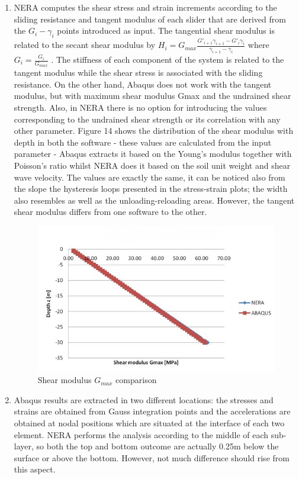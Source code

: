 \begin{enumerate}
		\item NERA computes the shear stress and strain increments according to the sliding resistance and tangent modulus of each slider that are derived from the $G_i-\gamma_i$ points introduced as input. The tangential shear modulus is related to the secant shear modulus by $H_i=G_{max}\frac{G'_{i+1}\gamma_{i+1}-G'_i\gamma_i}{\gamma_{i+1}-\gamma_i}$ where $G_i=\frac{G_i}{G_{max}}$ . The stiffness of each component of the system is related to the tangent modulus while the shear stress is associated with the sliding resistance. On the other hand, Abaqus does not work with the tangent modulus, but with maximum shear modulus Gmax and the undrained shear strength. Also, in NERA there is no option for introducing the values corresponding to the undrained shear strength or its correlation with any other parameter. Figure 14 shows the distribution of the shear modulus with depth in both the software - these values are calculated from the input parameter - Abaqus extracts it based on the Young's modulus together with Poisson's ratio whilst NERA does it based on the soil unit weight and shear wave velocity. The values are exactly the same, it can be noticed also from the slope the hysteresis loops presented in the stress-strain plots; the width also resembles as well as the unloading-reloading areas. However, the tangent shear modulus differs from one software to the other.
		\begin{figure}[h!]
			\centering
			\includegraphics[width=0.5\linewidth]{"shear"}
			\caption{Shear modulus $G_{max}$ comparison}
			\label{shear1}
		\end{figure}
		\item Abaqus results are extracted in two different locations: the stresses and strains are obtained from Gauss integration points and the accelerations are obtained at nodal positions which are situated at the interface of each two element. NERA performs the analysis according to the middle of each sub-layer, so both the top and bottom outcome are actually 0.25m below the surface or above the bottom. However, not much difference should rise from this aspect.

\end{enumerate}
